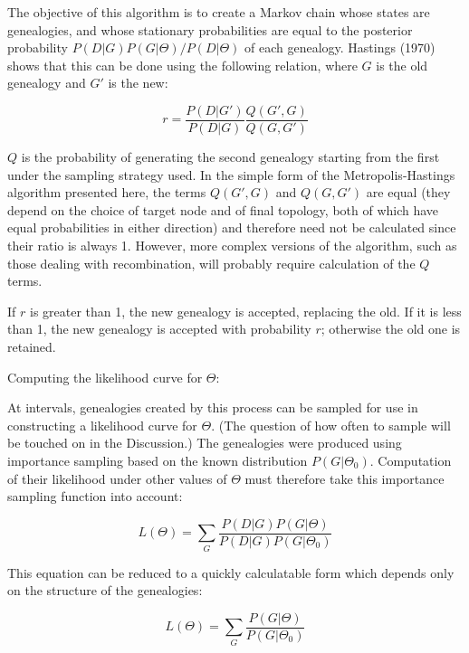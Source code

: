 \documentclass[12pt]{article}
\begin{document}
The objective of this algorithm is to create a Markov chain whose
states are genealogies, and whose
stationary probabilities are equal to the posterior probability 
$P(D|G)P(G|\Theta)/P(D|\Theta)$
of each genealogy.  {\sc Hastings} (1970) shows that this can be done using the
following relation, where $G$ is the old genealogy and $G'$ is the new:

\begin{equation}
r = 
\frac{P(D|G')}{P(D|G)} 
\frac{Q(G',G)}{Q(G,G')}
\end{equation}

$Q$ is the probability of generating the second
genealogy starting from the first under
the sampling strategy used.  In the simple form of
the Metropolis-Hastings algorithm presented here, the terms $Q(G',G)$
and $Q(G,G')$ are equal (they depend on the choice of target
node and of final topology, both of which have equal probabilities in either
direction) and therefore need not be calculated since their ratio is
always 1.  However, more complex versions of
the algorithm, such as those dealing with recombination, will probably
require calculation of the $Q$ terms.

If $r$ is greater than 1, the new genealogy is
accepted, replacing the old.  If it is less than 1, the new genealogy is
accepted with probability $r$; otherwise the old one is retained.

\bigskip

\begin{bf}
Computing the likelihood curve for $\Theta$: 
\end{bf}
At intervals, genealogies
created by this process can be sampled for use in constructing a
likelihood curve for $\Theta$.  (The question of how often to sample
will be touched on in the Discussion.)  The genealogies were produced
using importance sampling based on the known distribution $P(G|\Theta_0)$.
Computation of their likelihood under other values of $\Theta$ must 
therefore take this importance sampling function into account:

\begin{equation}
L(\Theta)=\sum_G \frac{P(D|G)P(G| \Theta)}{P(D|G)P(G| \Theta_0)}
\end{equation}

This equation can be reduced to a quickly calculatable form which
depends only on the structure of the genealogies:

\begin{equation}
L(\Theta)=\sum_G \frac{P(G| \Theta)}{P(G| \Theta_{0})}
\end{equation}
\end{document}
